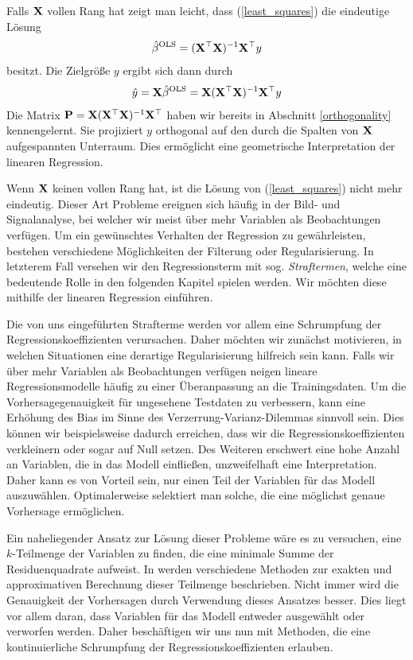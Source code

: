 Falls $\mathbf{X}$ vollen Rang hat zeigt man leicht, dass (\ref{least_squares}) die eindeutige Lösung
\begin{align}
\hat{\beta}^{\text{OLS}} = (\mathbf{X}^{\top}\mathbf{X})^{-1}\mathbf{X}^{\top} y
\end{align}
besitzt. Die Zielgröße $y$ ergibt sich dann durch
\begin{align}
\hat{y} = \mathbf{X} \hat{\beta}^{\text{OLS}} = \mathbf{X} (\mathbf{X}^{\top}\mathbf{X})^{-1}\mathbf{X}^{\top} y
\end{align}
Die Matrix $\mathbf{P} = \mathbf{X} (\mathbf{X}^{\top}\mathbf{X})^{-1}\mathbf{X}^{\top}$ haben wir bereits in Abschnitt \ref{orthogonality} kennengelernt. Sie projiziert $y$ orthogonal auf den durch die Spalten von $\mathbf{X}$ aufgespannten Unterraum. Dies ermöglicht eine geometrische Interpretation der linearen Regression.

Wenn $\mathbf{X}$ keinen vollen Rang hat, ist die Lösung von (\ref{least_squares}) nicht mehr eindeutig. Dieser Art Probleme ereignen sich häufig in der Bild- und Signalanalyse, bei welcher wir meist über mehr Variablen als Beobachtungen verfügen. Um ein gewünschtes Verhalten der Regression zu gewährleisten, bestehen verschiedene Möglichkeiten der Filterung oder Regularisierung. In letzterem Fall versehen wir den Regressionsterm mit sog. \textit{Straftermen}, welche eine bedeutende Rolle in den folgenden Kapitel spielen werden. Wir möchten diese mithilfe der linearen Regression einführen.

Die von uns eingeführten Strafterme werden vor allem eine Schrumpfung der Regressionskoeffizienten verursachen. Daher möchten wir zunächst motivieren, in welchen Situationen eine derartige Regularisierung hilfreich sein kann. Falls wir über mehr Variablen als Beobachtungen verfügen neigen lineare Regressionsmodelle häufig zu einer Überanpassung an die Trainingsdaten. Um die Vorhersagegenauigkeit für ungesehene Testdaten zu verbessern, kann eine Erhöhung des Bias im Sinne des Verzerrung-Varianz-Dilemmas sinnvoll sein. Dies können wir beispielsweise dadurch erreichen, dass wir die Regressionskoeffizienten verkleinern oder sogar auf Null setzen. Des Weiteren erschwert eine hohe Anzahl an Variablen, die in das Modell einfließen, unzweifelhaft eine Interpretation. Daher kann es von Vorteil sein, nur einen Teil der Variablen für das Modell auszuwählen. Optimalerweise selektiert man solche, die eine möglichst genaue Vorhersage ermöglichen.

Ein naheliegender Ansatz zur Lösung dieser Probleme wäre es zu versuchen, eine $k$-Teilmenge der Variablen zu finden, die eine minimale Summe der Residuenquadrate aufweist. In \cite{hastie_elements} werden verschiedene Methoden zur exakten und approximativen Berechnung dieser Teilmenge beschrieben. Nicht immer wird die Genauigkeit der Vorhersagen durch Verwendung dieses Ansatzes besser. Dies liegt vor allem daran, dass Variablen für das Modell entweder ausgewählt oder verworfen werden. Daher beschäftigen wir uns nun mit Methoden, die eine kontinuierliche Schrumpfung der Regressionskoeffizienten erlauben.


